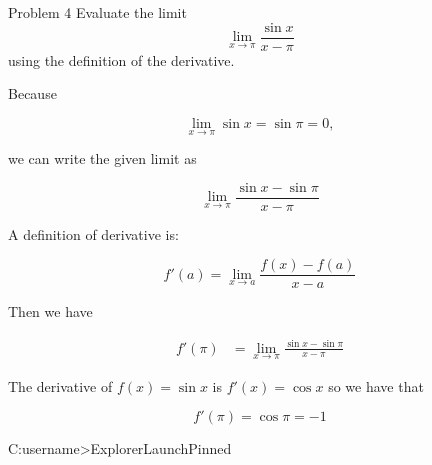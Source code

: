 \documentclass{article}
\begin{document}
    \begin{center}
    \end{center}

    \pagebreak
    \thispagestyle{page4}



    \begin{tbhtheorem}{Problem 4}
        Evaluate the limit
        \[
            \lim_{x\to \pi} \frac{\sin{x}}{x-\pi}
        \]
        using the definition of the derivative.
    \end{tbhtheorem}

    Because

    \[
        \lim_{x\to \pi} \sin{x} = \sin{\pi} = 0,
    \]

    we can write the given limit as

    \[
        \lim_{x\to \pi} \frac{\sin{x} - \sin{\pi}}{x-\pi}
    \]

    A definition of derivative is:

    \[
        f'(a) = \lim_{x\to a} \frac{f(x) - f(a)}{x-a}
    \]

    Then we have

    \begin{align*}
        f'(\pi) &=  \lim_{x\to \pi} \frac{\sin{x} - \sin{\pi}}{x-\pi}
    \end{align*}

    The derivative of $f(x) = \sin{x}$ is $f'(x)=\cos{x}$ so we have that

    \[
        f'(\pi) = \cos{\pi} = -1
    \]



    C:\Users\<username>\AppData\Roaming\Microsoft\Internet Explorer\Quick Launch\User Pinned\TaskBar
\end{document}
